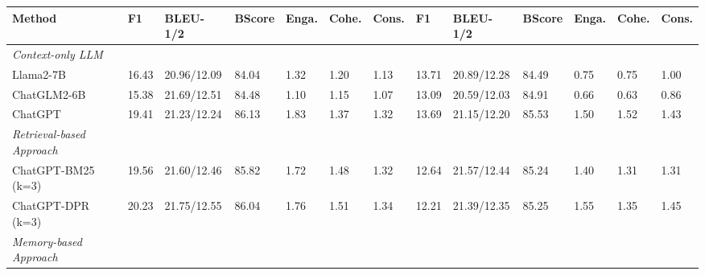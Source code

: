 \documentclass[authoryear,preprint,review,12pt]{elsarticle}
\begin{document}
\begin{table}[t]
{\begin{tabular}{lllllllllllll}
                                  
Method                            & F1             & BLEU-1/2             & BScore         & Enga.         & Cohe.         & Cons.         & F1             & BLEU-1/2             & BScore         & Enga.         & Cohe.         & Cons.         \\
\midrule
\textit{Context-only LLM}              &                &                      &                &               &               &               &                &                      &                &               &               &               \\
Llama2-7B                         & 16.43          & 20.96/12.09          & 84.04          & 1.32          & 1.20          & 1.13          & 13.71          & 20.89/12.28          & 84.49          & 0.75          & 0.75          & 1.00          \\
ChatGLM2-6B                       & 15.38          & 21.69/12.51          & 84.48          & 1.10          & 1.15          & 1.07          & 13.09          & 20.59/12.03          & 84.91          & 0.66          & 0.63          & 0.86          \\
ChatGPT                           & 19.41          & 21.23/12.24          & 86.13          & 1.83          & 1.37          & 1.32          & 13.69          & 21.15/12.20          & 85.53          & 1.50          & 1.52          & 1.43          \\
\midrule
\textit{Retrieval-based Approach} &                &                      &                &               &               &               &                &                      &                &               &               &               \\
ChatGPT-BM25 (k=3)                      & 19.56          & 21.60/12.46          & 85.82          & 1.72          & 1.48          & 1.32          & 12.64          & 21.57/12.44          & 85.24          & 1.40           & 1.31          & 1.31          \\
ChatGPT-DPR  (k=3)                     & 20.23          & 21.75/12.55          & 86.04          & 1.76          & 1.51          & 1.34          & 12.21          & 21.39/12.35          & 85.25          & 1.55          & 1.35          & 1.45          \\
\midrule
\textit{Memory-based Approach}    &                &                      &                &               &               &               &                &                      &                &               &               &               \\

\end{tabular}}
\end{table}
\end{document}
